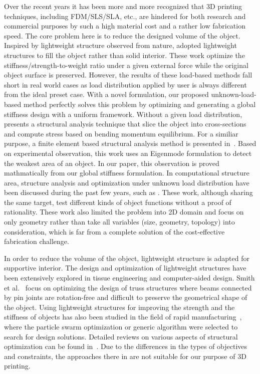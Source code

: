Over the recent years it has been more and more recognized that 3D printing techniques, including FDM/SLS/SLA, etc., are hindered for both research and commercial purposes by such a high material cost and a rather low fabrication speed. The core problem here is to reduce the designed volume of the object. Inspired by lightweight structure observed from nature, \cite{wang:2013, Lu:2014} adopted lightweight structures to fill the object rather than solid interior. These work optimize the stiffness/strength-to-weight ratio under a given external force while the original object surface is preserved. However, the results of these load-based methods fall short in real world cases as load distribution applied by user is always different from the ideal preset case. With a novel formulation, our proposed unknown-load-based method perfectly solves this problem by optimizing and generating a global stiffness design with a uniform framework. Without a given load distribution, \cite{umetani2013cross} presents a structural analysis technique that slice the object into cross-sections and compute stress based on bending momentum equilibrium. For a similiar purpose, a finite element based structural analysis method is presented in~\cite{zhou:2013}. Based on experimental observation, this work uses an Eigenmode formulation to detect the weakest area of an object. In our paper, this observation is proved mathmatically from our global stiffness formulation. In computational structure area, structure analysis and optimization under unknown load distribution have been discussed during the past few years, such as \cite{cherkaev2004principal,cherkaev1998stable,takezawa2011topology}. These work, although sharing the same target, test different kinds of object functions without a proof of rationality. These work also limited the problem into 2D domain and focus on only geometry rather than take all variables (size, geometry, topology) into consideration, which is far from a complete solution of the cost-effective fabrication challenge.

In order to reduce the volume of the object, lightweight structure is adapted for supportive interior. The design and optimization of lightweight structures have been extensively explored in tissue engineering and computer-aided design. 
Smith et al.~\cite{Smith:2002} focus on optimizing the design of truss structures where beams connected by pin joints are rotation-free and difficult to preserve the geometrical shape of the object.
Using lightweight structures for improving the strength and the stiffness of objects has also been studied in the field of rapid manufacturing~\cite{wang:2005}, where the particle swarm optimization or generic algorithm were selected to search for design solutions. Detailed reviews on various aspects of structural optimization can be found in~\cite{bendsoe:2003}. Due to the differences in the types of objectives and constraints, the approaches there in are not suitable for our purpose of 3D printing.

